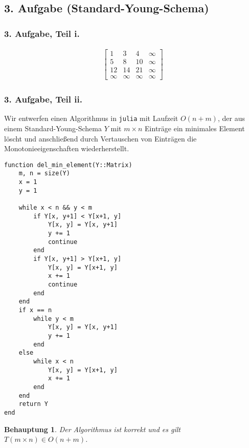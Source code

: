 \documentclass[draft,a5paper]{article}
\newtheorem*{beh}{Behauptung}
\begin{document}
\subsection*{3. Aufgabe (Standard-Young-Schema)}

\subsubsection*{3. Aufgabe, Teil i.}

\begin{align*}
  \begin{bmatrix}
    1 & 3 & 4 & \infty \\
    5 & 8 & 10 & \infty \\
    12 & 14 & 21 & \infty \\
    \infty & \infty & \infty & \infty
  \end{bmatrix}
\end{align*}

\subsubsection*{3. Aufgabe, Teil ii.}

Wir entwerfen einen Algorithmus in \texttt{julia} mit Laufzeit
\(O(n + m)\), der aus einem Standard-Young-Schema \(Y\) mit
\(m \times n\) Einträge ein minimales Element löscht und anschließend durch
Vertauschen von Einträgen die Monotonieeigenschaften wiederherstellt.

\begin{verbatim}
function del_min_element(Y::Matrix)
    m, n = size(Y)
    x = 1
    y = 1

    while x < n && y < m
        if Y[x, y+1] < Y[x+1, y]
            Y[x, y] = Y[x, y+1]
            y += 1
            continue
        end
        if Y[x, y+1] > Y[x+1, y]
            Y[x, y] = Y[x+1, y]
            x += 1
            continue
        end
    end
    if x == n
        while y < m
            Y[x, y] = Y[x, y+1]
            y += 1
        end
    else
        while x < n
            Y[x, y] = Y[x+1, y]
            x += 1
        end
    end
    return Y
end
\end{verbatim}

\begin{beh}
  Der Algorithmus ist korrekt und es gilt \(T(m \times n) \in O(n + m)\).
\end{beh}
\end{document}
